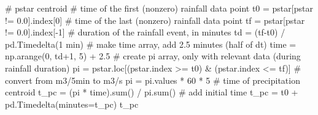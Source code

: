 \documentclass[
  letterpaper,
  DIV=11,
  numbers=noendperiod]{scrreprt}
\newenvironment{Shaded}{\begin{snugshade}}{\end{snugshade}}
\newcommand{\BuiltInTok}[1]{\textcolor[rgb]{0.00,0.23,0.31}{#1}}
\newcommand{\CommentTok}[1]{\textcolor[rgb]{0.37,0.37,0.37}{#1}}
\newcommand{\DecValTok}[1]{\textcolor[rgb]{0.68,0.00,0.00}{#1}}
\newcommand{\FloatTok}[1]{\textcolor[rgb]{0.68,0.00,0.00}{#1}}
\newcommand{\NormalTok}[1]{\textcolor[rgb]{0.00,0.23,0.31}{#1}}
\newcommand{\OperatorTok}[1]{\textcolor[rgb]{0.37,0.37,0.37}{#1}}
\newcommand{\StringTok}[1]{\textcolor[rgb]{0.13,0.47,0.30}{#1}}
\begin{document}
\begin{Shaded}
\begin{Highlighting}[]
\CommentTok{\# pstar centroid}
\CommentTok{\# time of the first (nonzero) rainfall data point}
\NormalTok{t0 }\OperatorTok{=}\NormalTok{ pstar[pstar }\OperatorTok{!=} \FloatTok{0.0}\NormalTok{].index[}\DecValTok{0}\NormalTok{]}
\CommentTok{\# time of the last (nonzero) rainfall data point}
\NormalTok{tf }\OperatorTok{=}\NormalTok{ pstar[pstar }\OperatorTok{!=} \FloatTok{0.0}\NormalTok{].index[}\OperatorTok{{-}}\DecValTok{1}\NormalTok{]}
\CommentTok{\# duration of the rainfall event, in minutes}
\NormalTok{td }\OperatorTok{=}\NormalTok{ (tf}\OperatorTok{{-}}\NormalTok{t0) }\OperatorTok{/}\NormalTok{ pd.Timedelta(}\StringTok{\textquotesingle{}1 min\textquotesingle{}}\NormalTok{)}
\CommentTok{\# make time array, add 2.5 minutes (half of dt)}
\NormalTok{time }\OperatorTok{=}\NormalTok{ np.arange(}\DecValTok{0}\NormalTok{, td}\OperatorTok{+}\DecValTok{1}\NormalTok{, }\DecValTok{5}\NormalTok{) }\OperatorTok{+} \FloatTok{2.5}
\CommentTok{\# create pi array, only with relevant data (during rainfall duration)}
\NormalTok{pi }\OperatorTok{=}\NormalTok{ pstar.loc[(pstar.index }\OperatorTok{\textgreater{}=}\NormalTok{ t0) }\OperatorTok{\&}\NormalTok{ (pstar.index }\OperatorTok{\textless{}=}\NormalTok{ tf)]}
\CommentTok{\# convert from m3/5min to m3/s}
\NormalTok{pi }\OperatorTok{=}\NormalTok{ pi.values }\OperatorTok{*} \DecValTok{60} \OperatorTok{*} \DecValTok{5}
\CommentTok{\# time of precipitation centroid}
\NormalTok{t\_pc }\OperatorTok{=}\NormalTok{ (pi }\OperatorTok{*}\NormalTok{ time).}\BuiltInTok{sum}\NormalTok{() }\OperatorTok{/}\NormalTok{ pi.}\BuiltInTok{sum}\NormalTok{()}
\CommentTok{\# add initial time}
\NormalTok{t\_pc }\OperatorTok{=}\NormalTok{ t0 }\OperatorTok{+}\NormalTok{ pd.Timedelta(minutes}\OperatorTok{=}\NormalTok{t\_pc)}
\NormalTok{t\_pc}


\end{Highlighting}
\end{Shaded}
\end{document}
